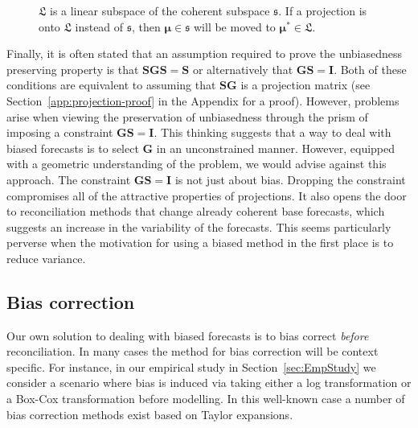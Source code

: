 \documentclass[12pt]{article}
\theoremstyle{definition}
\begin{document}
\begin{figure}[!hbt]
  \centering
  \vspace{-0.9cm}
		\small
		\resizebox{0.8\linewidth}{!}{
			
		}
		\caption{$\mathfrak{L}$ is a linear subspace of the coherent subspace $\mathfrak{s}$. If a projection is onto $\mathfrak{L}$ instead of $\mathfrak{s}$, then $\bm{\mu} \in \mathfrak{s}$ will be moved to $\bm{\mu}^* \in \mathfrak{L}$.}\label{fig:Schematic_3D}
\end{figure}

Finally, it is often stated that an assumption required to prove the unbiasedness preserving property is that $\bm{S}\bm{G}\bm{S}=\bm{S}$ or alternatively that $\bm{G}\bm{S}=\bm{I}$. Both of these conditions are equivalent to assuming that $\bm{S}\bm{G}$ is a projection matrix (see Section~\ref{app:projection-proof} in the Appendix for a proof). However, problems arise when viewing the preservation of unbiasedness through the prism of imposing a constraint $\bm{G}\bm{S}=\bm{I}$. This thinking suggests that a way to deal with biased forecasts is to select $\bm{G}$ in an unconstrained manner. However, equipped with a geometric understanding of the problem, we would advise against this approach. The constraint $\bm{G}\bm{S}=\bm{I}$ is not just about bias. Dropping the constraint compromises all of the attractive properties of projections. It also opens the door to reconciliation methods that change already coherent base forecasts, which suggests an increase in the variability of the forecasts. This seems particularly perverse when the motivation for using a biased method in the first place is to reduce variance.

\subsection{Bias correction}

Our own solution to dealing with biased forecasts is to bias correct \emph{before} reconciliation. In many cases the method for bias correction will be context specific. For instance, in our empirical study in Section~\ref{sec:EmpStudy} we consider a scenario where bias is induced via taking either a log transformation or a Box-Cox transformation before modelling. In this well-known case a number of bias correction methods exist based on Taylor expansions.
\end{document}
